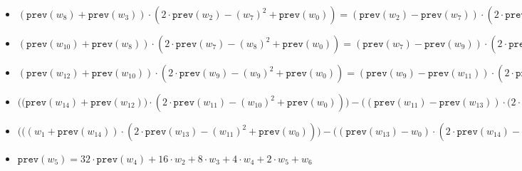 \begin{itemize}
    \item $(\texttt{prev}(w_{8}) + \texttt{prev}(w_{3})) \cdot (2 \cdot \texttt{prev}(w_2) - (w_7)^2 + \texttt{prev}(w_{0})) = (\texttt{prev}(w_2) - \texttt{prev}(w_7)) \cdot (2 \cdot \texttt{prev}(w_{3}) - w_7 \cdot (2 \cdot \texttt{prev}(w_2) - (w_7)^2 + \texttt{prev}(w_{0})))$
    \item $(\texttt{prev}(w_{10}) + \texttt{prev}(w_{8})) \cdot (2 \cdot \texttt{prev}(w_7) - (w_8)^2 + \texttt{prev}(w_{0})) = (\texttt{prev}(w_7) - \texttt{prev}(w_9)) \cdot (2 \cdot \texttt{prev}(w_{8}) - w_8 \cdot (2 \cdot \texttt{prev}(w_7) - (w_8)^2 + \texttt{prev}(w_{0})))$
    \item $(\texttt{prev}(w_{12}) + \texttt{prev}(w_{10})) \cdot (2 \cdot \texttt{prev}(w_9) - (w_9)^2 + \texttt{prev}(w_{0})) = (\texttt{prev}(w_9) - \texttt{prev}(w_{11})) \cdot (2 \cdot \texttt{prev}(w_{10}) - w_9 \cdot (2 \cdot \texttt{prev}(w_9) - (w_9)^2 + \texttt{prev}(w_{0})))$
    \item $\biggl( \bigl(\texttt{prev}(w_{14}) + \texttt{prev}(w_{12})) \cdot  (2 \cdot \texttt{prev}(w_{11}) - (w_{10})^2 + \texttt{prev}(w_{0}))\bigr) - \bigl( (\texttt{prev}(w_{11}) - \texttt{prev}(w_{13})) \cdot (2 \cdot \texttt{prev}(w_{12}) - w_{10} \cdot (2 \cdot \texttt{prev}(w_{11}) - (w_{10})^2 + \texttt{prev}(w_{0})) \bigr) \biggr) \cdot  (\texttt{next}(w_8)\cdot \texttt{next}(w_2)) = 0$
    \item $\biggl( \bigl( (w_{1} + \texttt{prev}(w_{14})) \cdot (2 \cdot \texttt{prev}(w_{13}) - (w_{11})^2 + \texttt{prev}(w_{0})) \bigr) - \bigl( (\texttt{prev}(w_{13}) - w_{0}) \cdot (2 \cdot \texttt{prev}(w_{14}) - w_{11} \cdot (2 \cdot \texttt{prev}(w_{13}) - (w_{11})^2 + \texttt{prev}(w_{0}))) \bigr) \biggr) \cdot  (\texttt{next}(w_8)\cdot \texttt{next}(w_2)) = 0$ \\

    \item $\texttt{prev}(w_5) = 32 \cdot \texttt{prev}(w_4) + 16 \cdot w_{2} + 8 \cdot w_{3} + 4 \cdot w_{4} + 2 \cdot w_{5} + w_{6}$ \\


\end{itemize}
